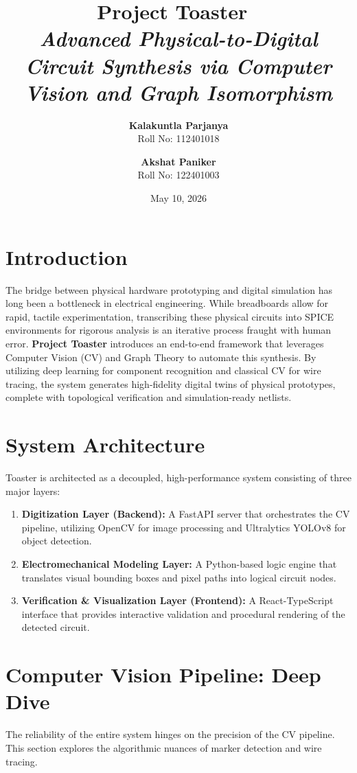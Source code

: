 \documentclass[11pt,a4paper]{article}
\title{
    \vspace{-2cm}
    \textbf{\Huge Project Toaster 🍞} \\
    \vspace{0.5cm}
    \Large \textit{Advanced Physical-to-Digital Circuit Synthesis via Computer Vision and Graph Isomorphism}
}
\author{
    \textbf{Kalakuntla Parjanya} \\
    Roll No: 112401018 \\
    \and
    \textbf{Akshat Paniker} \\
    Roll No: 122401003
}
\date{May 10, 2026}
\begin{document}
\maketitle

\section{Introduction}
The bridge between physical hardware prototyping and digital simulation has long been a bottleneck in electrical engineering. While breadboards allow for rapid, tactile experimentation, transcribing these physical circuits into SPICE environments for rigorous analysis is an iterative process fraught with human error. \textbf{Project Toaster} introduces an end-to-end framework that leverages Computer Vision (CV) and Graph Theory to automate this synthesis. By utilizing deep learning for component recognition and classical CV for wire tracing, the system generates high-fidelity digital twins of physical prototypes, complete with topological verification and simulation-ready netlists.

\section{System Architecture}
Toaster is architected as a decoupled, high-performance system consisting of three major layers:
\begin{enumerate}
    \item \textbf{Digitization Layer (Backend):} A FastAPI server that orchestrates the CV pipeline, utilizing OpenCV for image processing and Ultralytics YOLOv8 for object detection.
    \item \textbf{Electromechanical Modeling Layer:} A Python-based logic engine that translates visual bounding boxes and pixel paths into logical circuit nodes.
    \item \textbf{Verification \& Visualization Layer (Frontend):} A React-TypeScript interface that provides interactive validation and procedural rendering of the detected circuit.
\end{enumerate}

\section{Computer Vision Pipeline: Deep Dive}
The reliability of the entire system hinges on the precision of the CV pipeline. This section explores the algorithmic nuances of marker detection and wire tracing.
\end{document}
